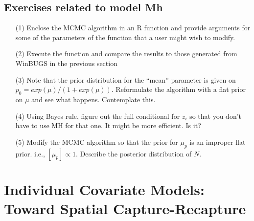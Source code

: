 \subsection{Exercises related to model Mh}

\begin{itemize}
\item[(1)] Enclose the MCMC algorithm in an R function and provide
  arguments for some of the parameters of the function that a user
  might wish to modify.
\item[(2)] Execute the function and compare the results to those
  generated from WinBUGS in the previous section
\item[(3)] Note that the prior distribution for the ``mean'' parameter
  is given on $p_0=exp(\mu)/(1+exp(\mu))$.  Reformulate the algorithm
  with a flat prior on $\mu$ and see what happens. Contemplate this.
\item[(4)] Using Bayes rule, figure out the full conditional for
  $z_{i}$ so that you don't have to use MH for that one. It might be
  more efficient. Is it?
\item[(5)] Modify the MCMC algorithm so that the prior for $\mu_{p}$
  is an improper flat prior. i.e., $[\mu_{p}] \propto 1$. Describe the
  posterior distribution of $N$. 
\end{itemize}


\section{Individual Covariate Models: Toward Spatial Capture-Recapture}
\label{closed.sec.indcov}


